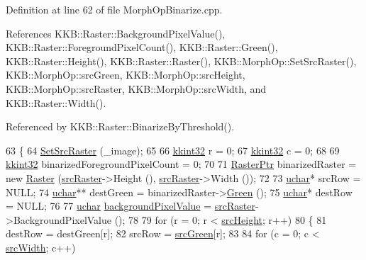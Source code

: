 Definition at line 62 of file Morph\+Op\+Binarize.\+cpp.



References K\+K\+B\+::\+Raster\+::\+Background\+Pixel\+Value(), K\+K\+B\+::\+Raster\+::\+Foreground\+Pixel\+Count(), K\+K\+B\+::\+Raster\+::\+Green(), K\+K\+B\+::\+Raster\+::\+Height(), K\+K\+B\+::\+Raster\+::\+Raster(), K\+K\+B\+::\+Morph\+Op\+::\+Set\+Src\+Raster(), K\+K\+B\+::\+Morph\+Op\+::src\+Green, K\+K\+B\+::\+Morph\+Op\+::src\+Height, K\+K\+B\+::\+Morph\+Op\+::src\+Raster, K\+K\+B\+::\+Morph\+Op\+::src\+Width, and K\+K\+B\+::\+Raster\+::\+Width().



Referenced by K\+K\+B\+::\+Raster\+::\+Binarize\+By\+Threshold().


\begin{DoxyCode}
63 \{
64   \hyperlink{class_k_k_b_1_1_morph_op_a07c75e151d9b95ca13da3bfc2e48dba4}{SetSrcRaster} (\_image);
65 
66   \hyperlink{namespace_k_k_b_a8fa4952cc84fda1de4bec1fbdd8d5b1b}{kkint32}  r = 0;
67   \hyperlink{namespace_k_k_b_a8fa4952cc84fda1de4bec1fbdd8d5b1b}{kkint32}  c = 0;
68 
69   \hyperlink{namespace_k_k_b_a8fa4952cc84fda1de4bec1fbdd8d5b1b}{kkint32}  binarizedForegroundPixelCount = 0;
70 
71   \hyperlink{class_k_k_b_1_1_raster}{RasterPtr}   binarizedRaster = \textcolor{keyword}{new} \hyperlink{class_k_k_b_1_1_raster}{Raster} (\hyperlink{class_k_k_b_1_1_morph_op_a9af0ebff0135d124c7d1d17e21c4d7e6}{srcRaster}->Height (), 
      \hyperlink{class_k_k_b_1_1_morph_op_a9af0ebff0135d124c7d1d17e21c4d7e6}{srcRaster}->Width ());
72 
73   \hyperlink{namespace_k_k_b_ace9969169bf514f9ee6185186949cdf7}{uchar}*      srcRow     = NULL;
74   \hyperlink{namespace_k_k_b_ace9969169bf514f9ee6185186949cdf7}{uchar}**     destGreen  = binarizedRaster->\hyperlink{class_k_k_b_1_1_raster_a2dbd81f2cb60b3716bcf6467050dde93}{Green} ();
75   \hyperlink{namespace_k_k_b_ace9969169bf514f9ee6185186949cdf7}{uchar}*      destRow    = NULL;
76 
77   \hyperlink{namespace_k_k_b_ace9969169bf514f9ee6185186949cdf7}{uchar}       \hyperlink{class_k_k_b_1_1_morph_op_a0c3862d1c8427c4d246e0bcd56699741}{backgroundPixelValue} = \hyperlink{class_k_k_b_1_1_morph_op_a9af0ebff0135d124c7d1d17e21c4d7e6}{srcRaster}->BackgroundPixelValue ();
78 
79   \textcolor{keywordflow}{for}  (r = 0;  r < \hyperlink{class_k_k_b_1_1_morph_op_a54b2ce1b398a80803b4dbe8aef956b51}{srcHeight};  r++)
80   \{
81     destRow = destGreen[r];
82     srcRow  = \hyperlink{class_k_k_b_1_1_morph_op_ab811c702f7e0c8ffccdd21111c8144ab}{srcGreen}[r];
83 
84     \textcolor{keywordflow}{for}  (c = 0; c  < \hyperlink{class_k_k_b_1_1_morph_op_aec2cfb3015497e4077751fc5f19559ab}{srcWidth};  c++)

\end{DoxyCode}
